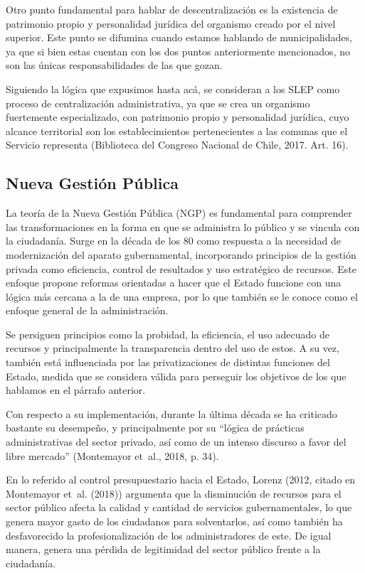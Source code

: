 \documentclass[
  12pt,
  letterpaper,
]{article}
\begin{document}
Otro punto fundamental para hablar de descentralización es la existencia de patrimonio propio y personalidad jurídica del organismo creado por el nivel superior.
Este punto se difumina cuando estamos hablando de municipalidades, ya que si bien estas cuentan con los dos puntos anteriormente mencionados, no son las únicas responsabilidades de las que gozan.

Siguiendo la lógica que expusimos hasta acá, se consideran a los SLEP como proceso de centralización administrativa, ya que se crea un organismo fuertemente especializado, con patrimonio propio y personalidad jurídica, cuyo alcance territorial son los establecimientos pertenecientes a las comunas que el Servicio representa (Biblioteca del Congreso Nacional de Chile, 2017. Art. 16).

\subsection{Nueva Gestión Pública}\label{nueva-gestiuxf3n-puxfablica}

La teoría de la Nueva Gestión Pública (NGP) es fundamental para comprender las transformaciones en la forma en que se administra lo público y se vincula con la ciudadanía.
Surge en la década de los 80 como respuesta a la necesidad de modernización del aparato gubernamental, incorporando principios de la gestión privada como eficiencia, control de resultados y uso estratégico de recursos.
Este enfoque propone reformas orientadas a hacer que el Estado funcione con una lógica más cercana a la de una empresa, por lo que también se le conoce como el enfoque general de la administración.

Se persiguen principios como la probidad, la eficiencia, el uso adecuado de recursos y principalmente la transparencia dentro del uso de estos.
A su vez, también está influenciada por las privatizaciones de distintas funciones del Estado, medida que se considera válida para perseguir los objetivos de los que hablamos en el párrafo anterior.

Con respecto a su implementación, durante la última década se ha criticado bastante su desempeño, y principalmente por su ``lógica de prácticas administrativas del sector privado, así como de un intenso discurso a favor del libre mercado'' (Montemayor et~al., 2018, p. 34).

En lo referido al control presupuestario hacia el Estado, Lorenz (2012, citado en Montemayor et~al. (2018)) argumenta que la disminución de recursos para el sector público afecta la calidad y cantidad de servicios gubernamentales, lo que genera mayor gasto de los ciudadanos para solventarlos, así como también ha desfavorecido la profesionalización de los administradores de este.
De igual manera, genera una pérdida de legitimidad del sector público frente a la ciudadanía.
\end{document}
